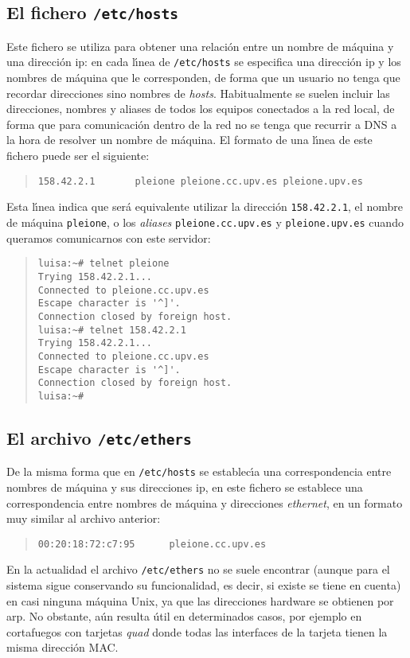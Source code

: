 \subsection{El fichero {\tt /etc/hosts}}
Este fichero se utiliza para obtener una relaci\'on entre un nombre de m\'aquina
y una direcci\'on {\sc ip}: en cada l\'{\i}nea de {\tt /etc/hosts} se 
especifica una direcci\'on {\sc ip} y
los nombres de m\'aquina que le corresponden, de forma que un usuario no tenga
que recordar direcciones sino nombres de {\it hosts}. Habitualmente se suelen
incluir las direcciones, nombres y aliases de todos los equipos conectados a
la red local, de forma que para comunicaci\'on dentro de la red no se tenga que
recurrir a DNS a la hora de resolver un nombre de m\'aquina. El formato de
una l\'{\i}nea de este fichero puede ser el siguiente:
\tt
\begin{quote}
\begin{verbatim}
158.42.2.1       pleione pleione.cc.upv.es pleione.upv.es
\end{verbatim}
\end{quote}
\rm
Esta l\'{\i}nea indica que ser\'a equivalente utilizar la direcci\'on 
{\tt 158.42.2.1}, el nombre de m\'aquina {\tt pleione}, o los {\it aliases}
{\tt pleione.cc.upv.es} y {\tt pleione.upv.es} cuando queramos comunicarnos con 
este servidor:
\tt
\begin{quote}
\begin{verbatim}
luisa:~# telnet pleione
Trying 158.42.2.1...
Connected to pleione.cc.upv.es
Escape character is '^]'.
Connection closed by foreign host.
luisa:~# telnet 158.42.2.1
Trying 158.42.2.1...
Connected to pleione.cc.upv.es
Escape character is '^]'.
Connection closed by foreign host.
luisa:~#
\end{verbatim}
\end{quote}
\rm
\subsection{El archivo {\tt /etc/ethers}}
De la misma forma que en {\tt /etc/hosts} se establec\'{\i}a una correspondencia
entre nombres de m\'aquina y sus direcciones {\sc ip}, en este fichero se
establece una correspondencia entre nombres de m\'aquina y direcciones {\it
ethernet}, en un formato muy similar al archivo anterior:
\tt
\begin{quote}
\begin{verbatim}
00:20:18:72:c7:95      pleione.cc.upv.es
\end{verbatim}
\end{quote}
\rm
En la actualidad el archivo {\tt /etc/ethers} no se suele encontrar 
(aunque para el sistema sigue conservando su funcionalidad, es decir, si 
existe se tiene en cuenta) en casi ninguna m\'aquina Unix, ya que las 
direcciones hardware se obtienen por {\sc arp}. No obstante, a\'un resulta 
\'util en determinados casos, por ejemplo en cortafuegos con tarjetas {\it
quad} donde todas las interfaces de la tarjeta tienen la misma direcci\'on
MAC.
